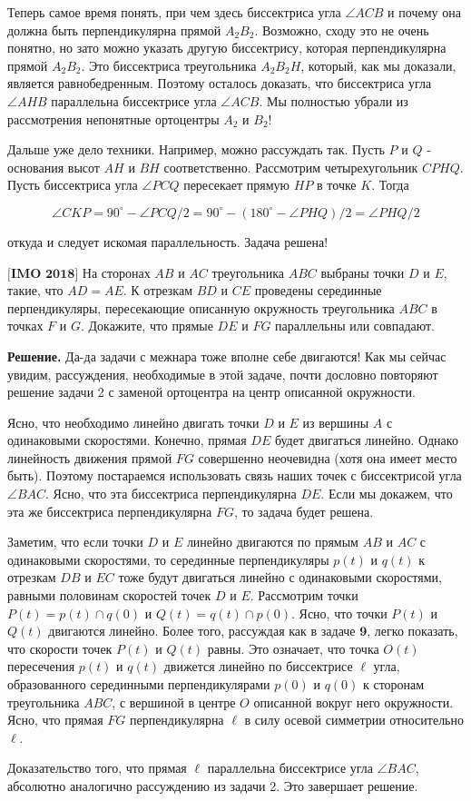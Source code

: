 Теперь самое время понять, при чем здесь биссектриса угла $\angle A C B$ и почему она должна быть перпендикулярна прямой $A_2 B_2$. Возможно, сходу это не очень понятно, но зато можно указать другую биссектрису, которая перпендикулярна прямой $A_2 B_2$. Это биссектриса треугольника $A_2 B_2 H$, который, как мы доказали, является равнобедренным. Поэтому осталось доказать, что биссектриса угла $\angle A H B$ параллельна биссектрисе угла $\angle A C B$. Мы полностью убрали из рассмотрения непонятные ортоцентры $A_2$ и $B_2$!

Дальше уже дело техники. Например, можно рассуждать так. Пусть $P$ и $Q$ - основания высот $A H$ и $B H$ соответственно. Рассмотрим четырехугольник $C P H Q$. Пусть биссектриса угла $\angle P C Q$ пересекает прямую $H P$ в точке $K$. Тогда

$$
\angle C K P=90^{\circ}-\angle P C Q / 2=90^{\circ}-\left(180^{\circ}-\angle P H Q\right) / 2=\angle P H Q / 2
$$

откуда и следует искомая параллельность. Задача решена!

$\bigl[\textbf{IMO 2018}\bigr]$
На сторонах $A B$ и $A C$ треугольника $A B C$ выбраны точки $D$ и $E$, такие, что $A D=A E$. К отрезкам $B D$ и $C E$ проведены серединные перпендикуляры, пересекающие описанную окружность треугольника $A B C$ в точках $F$ и $G$. Докажите, что прямые $D E$ и $F G$ параллельны или совпадают.

\textbf{Решение.} Да-да задачи с межнара тоже вполне себе двигаются! Как мы сейчас увидим, рассуждения, необходимые в этой задаче, почти дословно повторяют решение задачи 2 с заменой ортоцентра на центр описанной окружности.

Ясно, что необходимо линейно двигать точки $D$ и $E$ из вершины $A$ с одинаковыми скоростями. Конечно, прямая $D E$ будет двигаться линейно. Однако линейность движения прямой $F G$ совершенно неочевидна (хотя она имеет место быть). Поэтому постараемся использовать связь наших точек с биссектрисой угла $\angle B A C$. Ясно, что эта биссектриса перпендикулярна $D E$. Если мы докажем, что эта же биссектриса перпендикулярна $F G$, то задача будет решена.


\newpage

\hspace{3mm}

Заметим, что если точки $D$ и $E$ линейно двигаются по прямым $A B$ и $A C$ с одинаковыми скоростями, то серединные перпендикуляры $p(t)$ и $q(t)$ к отрезкам $D B$ и $E C$ тоже будут двигаться линейно с одинаковыми скоростями, равными половинам скоростей точек $D$ и $E$. Рассмотрим точки $P(t)=p(t) \cap q(0)$ и $Q(t)=q(t) \cap p(0)$. Ясно, что точки $P(t)$ и $Q(t)$ двигаются линейно. Более того, рассуждая как в задаче $\mathbf{9}$, легко показать, что скорости точек $P(t)$ и $Q(t)$ равны. Это означает, что точка $O(t)$ пересечения $p(t)$ и $q(t)$ движется линейно по биссектрисе $\ell$ угла, образованного серединными перпендикулярами $p(0)$ и $q(0)$ к сторонам треугольника $A B C$, с вершиной в центре $O$ описанной вокруг него окружности. Ясно, что прямая $F G$ перпендикулярна $\ell$ в силу осевой симметрии относительно $\ell$.

Доказательство того, что прямая $\ell$ параллельна биссектрисе угла $\angle B A C$, абсолютно аналогично рассуждению из задачи 2. Это завершает решение.